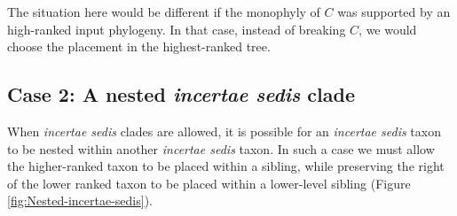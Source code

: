 \documentclass[english]{article}
\begin{document}
The situation here would be different if the monophyly of $C$ was
supported by an high-ranked input phylogeny. In that case, instead of
breaking $C$, we would choose the placement in the highest-ranked
tree.

\subsection{Case 2: A nested \emph{incertae sedis} clade}

When \emph{incertae sedis} clades are allowed, it is possible for an
\emph{incertae sedis} taxon to be nested within another \emph{incertae
sedis} taxon. In such a case we must allow the higher-ranked taxon to
be placed within a sibling, while preserving the right of the lower
ranked taxon to be placed within a lower-level sibling (Figure
\ref{fig:Nested-incertae-sedis}).
\end{document}

